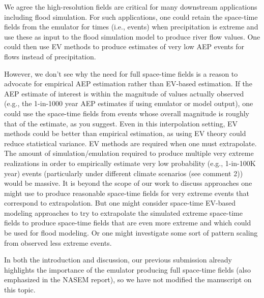 \documentclass[12pt,english]{reviewresponse}
\begin{document}
\begin{revresponse}

We agree the high-resolution fields are critical for many downstream applications including flood simulation. 
For such applications, one could retain the space-time fields from the emulator for times (i.e., events) when precipitation is extreme 
and use these as input to the flood simulation model to produce river flow values. 
One could then use EV methods to produce estimates of very low AEP events for flows instead of precipitation. 

However, we don't see why the need for full space-time fields is a reason to advocate for empirical AEP estimation rather than EV-based estimation. If the AEP estimate of interest is within the magnitude of values actually observed (e.g., the 1-in-1000 year AEP estimates if using emulator or model output), one could use the space-time fields from events whose overall magnitude is roughly that of the estimate, as you suggest. Even in this interpolation setting, EV methods could be better than empirical estimation, as using EV theory could reduce statistical variance. EV methods are required when one must extrapolate.
The amount of simulation/emulation required to produce multiple very extreme realizations in order to empirically estimate very low probability (e.g., 1-in-100K year) events (particularly under different climate scenarios (see comment 2)) would be massive.
It is beyond the scope of our work to discuss approaches one might use to produce reasonable space-time fields for very extreme events that correspond to extrapolation. 
But one might consider space-time EV-based modeling approaches to try to extrapolate the simulated extreme space-time fields to produce space-time fields that are even more extreme and which could be used for flood modeling. Or one might investigate some sort of pattern scaling from observed less extreme events.


In both the introduction and discussion, our previous submission already highlights the importance of the emulator producing full space-time fields (also emphasized in the NASEM report), so we have not modified the manuscript on this topic.

\end{revresponse}
\end{document}
